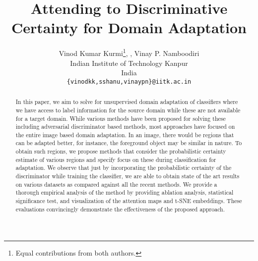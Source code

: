 \documentclass[10pt,twocolumn,letterpaper]{article}
\begin{document}
\title{Attending to Discriminative Certainty for Domain Adaptation}

\author{{Vinod Kumar Kurmi}\thanks{Equal contributions from both authors.}, \footnotemark[1],  \quad  Vinay P. Namboodiri\\
Indian Institute of Technology Kanpur\\
India\\
{\tt\small \{vinodkk,sshanu,vinaypn\}@iitk.ac.in}}

\maketitle


\begin{abstract}
  In this paper, we aim to solve for unsupervised domain adaptation of classifiers where we have access to label information for the source domain while these are not available for a target domain. While various methods have been proposed for solving these including adversarial discriminator based methods, most approaches have focused on the entire image based domain adaptation. In an image, there would be regions that can be adapted better, for instance, the foreground object may be similar in nature. To obtain such regions, we propose methods that consider the probabilistic certainty estimate of various regions and specify focus on these during classification for adaptation. We observe that just by incorporating the probabilistic certainty of the discriminator while training the classifier, we are able to obtain state of the art results on various datasets as compared against all the recent methods. We provide a thorough empirical analysis of the method by providing ablation analysis, statistical significance test, and visualization of the attention maps and t-SNE embeddings. These evaluations convincingly demonstrate the effectiveness of the proposed approach.
\end{abstract}
\end{document}
